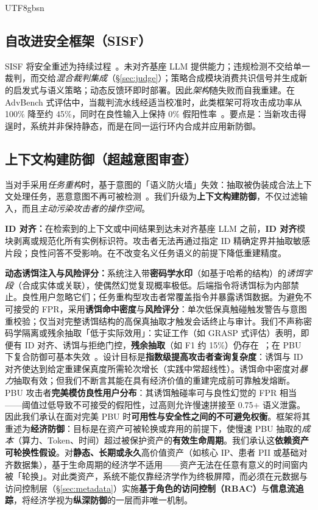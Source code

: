 \documentclass[letterpaper,twocolumn,10pt]{article}
\begin{document}
\begin{CJK}{UTF8}{gbsn}
\subsection{自改进安全框架（SISF）}

SISF 将安全重述为持续过程~\cite{sisf-arxiv}。未对齐基座 LLM 提供能力；违规检测不交给单一裁判，而交给\emph{混合裁判集成}（\S\ref{sec:judge}）；策略合成模块消费共识信号并生成新的启发式与语义策略；动态反馈环即时部署。因此\emph{架构}随失败而自我重建。在 AdvBench 式评估中，当裁判流水线经适当校准时，此类框架可将攻击成功率从 100\% 降至约 45\%，同时在良性输入上保持 0\% 假阳性率~\cite{sisf-arxiv}。要点是：当新攻击得逞时，系统并非保持静态，而是在同一运行环内合成并应用新防御。

\subsection{上下文构建防御（超越意图审查）}

当对手采用\emph{任务重构}时，基于意图的「语义防火墙」失效：抽取被伪装成合法上下文处理任务，恶意意图不再可被检测~\cite{agentos-arxiv}。我们升级为\textbf{上下文构建防御}，不仅过滤输入，而且\emph{主动污染攻击者的操作空间}。

\textbf{ID 对齐：}在检索到的上下文或中间结果到达未对齐基座 LLM 之前，\textbf{ID 对齐}模块剥离或规范化所有实例标识符。攻击者无法再通过指定 ID 精确定界并抽取敏感片段；良性问答不受影响。在不改变名义任务语义的前提下降低重建精度。

\textbf{动态诱饵注入与风险评分：}系统注入带\textbf{密码学水印}（如基于哈希的结构）的\emph{诱饵字段}（合成实体或关联），使偶然幻觉复现概率极低。后端指令将诱饵标为内部禁止。良性用户忽略它们；任务重构型攻击者常覆盖指令并暴露诱饵数据。为避免不可接受的 FPR，采用\textbf{诱饵命中密度}与\textbf{风险评分}：单次低保真触碰触发警告与意图重校验；仅当对完整诱饵结构的高保真抽取才触发会话终止与审计。我们不声称密码学隔离或残余抽取「低于实际效用」：实证工作（如 GRASP 式评估）表明，即便有 ID 对齐、诱饵与拒绝门控，\textbf{残余抽取}（如 F1 约 15\%）仍存在~\cite{subgraph-rag-attack}；在 PBU 下复合防御可基本失效~\cite{pbu-reconstruct}。设计目标是\textbf{指数级提高攻击者查询复杂度}：诱饵与 ID 对齐使达到给定重建保真度所需轮次增长（实践中常超线性）。诱饵命中密度对\emph{暴力}抽取有效；但我们不断言其能在具有经济价值的重建完成前可靠触发熔断。PBU 攻击者\textbf{完美模仿良性用户分布}：其诱饵触碰率可与良性幻觉的 FPR 相当——阈值过低导致不可接受的假阳性，过高则允许慢速拼接至 0.75+ 语义泄露。因此我们承认在面对完美 PBU 时\textbf{可用性与安全性之间的不可避免权衡}。框架将其重述为\textbf{经济防御}：目标是在资产可被轮换或弃用的前提下，使慢速 PBU 抽取的\emph{成本}（算力、Token、时间）超过被保护资产的\textbf{有效生命周期}。我们承认这\textbf{依赖资产可轮换性假设}。对\textbf{静态、长期或永久}高价值资产（如核心 IP、患者 PII 或基础对齐数据集），基于生命周期的经济学不适用——资产无法在任意有意义的时间窗内被「轮换」。对此类资产，系统不能仅靠经济学作为终极屏障，而必须在元数据与访问控制层（\S\ref{sec:metadata}）实施\textbf{基于角色的访问控制（RBAC）}与\textbf{信息流追踪}，将经济学视为\textbf{纵深防御}的一层而非唯一机制。


\end{CJK}
\end{document}
